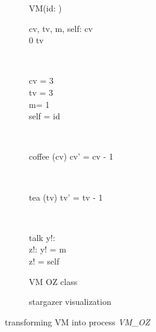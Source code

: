 \begin{figure}[H]
\begin{subfigure}{.6\textwidth}
\centering
\begin{class}{VM(id: \integer)}
\\
\begin{state}
cv, tv, m, self: \integer
{} \leq  cv 
\\
0 \leq  tv 
\end{state} 
\\
\begin{init}
cv = 3
\\tv = 3
\\ m= 1
\\self = id
\end{init} 
\\
\begin{op}{coffee}
\Delta (cv)
\ST
cv' = cv - 1
\end{op}
\\
\begin{op}{tea}
\Delta (tv)
\ST
tv' = tv - 1
\end{op}
\\
\begin{op}{talk}
y!: \integer
\\z!: \integer
\ST
y! = m
\\z! = self
\end{op}
\end{class}
  \caption{VM OZ class}
\end{subfigure}%
\begin{subfigure}{.4\textwidth}
  \centering
{}
  \caption{stargazer visualization}
\end{subfigure}
\caption{transforming VM into \picalc{} process \textit{VM\_OZ}}
\label{tra_vm_OZ}
\end{figure}

